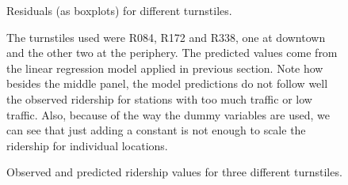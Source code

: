 \documentclass[a4paper,12pt,english]{sphinxmanual}
\begin{document}
\begin{figure}[htbp]
\centering
\capstart

\caption{Residuals (as boxplots) for different turnstiles.}\label{section2:figure38}\end{figure}
\begin{figure}[htbp]
\centering
\capstart

\caption{Observed and predicted ridership values for three different turnstiles.}{\small 
The turnstiles used were R084, R172 and R338, one at downtown and the other
two at the periphery. The predicted values come from the linear regression
model applied in previous section. Note how besides the middle panel, the
model predictions do not follow well the observed ridership for stations with
too much traffic or low traffic. Also, because of the way the  dummy
variables are used, we can see that just adding a constant is not enough to
scale the ridership for individual locations.
}\label{section2:figure39}\end{figure}
\end{document}
